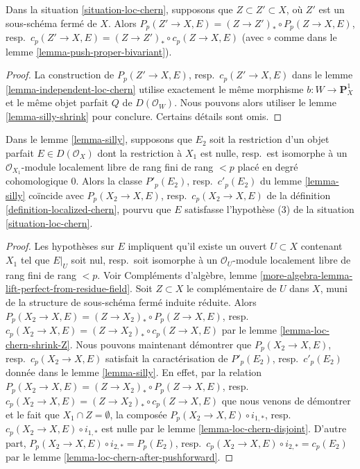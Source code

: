 \begin{lemma}
\label{lemma-loc-chern-shrink-Z}
Dans la situation \ref{situation-loc-chern},
supposons que $Z \subset Z' \subset X$, où $Z'$ est un sous-schéma fermé de $X$.
Alors
$P_p(Z' \to X, E) = (Z \to Z')_* \circ P_p(Z \to X, E)$,
resp.\ $c_p(Z' \to X, E) = (Z \to Z')_* \circ c_p(Z \to X, E)$
(avec $\circ$ comme dans le lemme \ref{lemma-push-proper-bivariant}).
\end{lemma}

\begin{proof}
La construction de $P_p(Z' \to X, E)$,
resp.\ $c_p(Z' \to X, E)$ dans le lemme \ref{lemma-independent-loc-chern}
utilise exactement le même morphisme
$b : W \to \mathbf{P}^1_X$ et le même objet parfait $Q$ de $D(\mathcal{O}_W)$.
Nous pouvons alors utiliser le lemme \ref{lemma-silly-shrink} pour conclure.
Certains détails sont omis.
\end{proof}

\begin{lemma}
\label{lemma-loc-chern-agree}
Dans le lemme \ref{lemma-silly}, supposons que $E_2$ soit la restriction d'un objet parfait
$E \in D(\mathcal{O}_X)$ dont la restriction à $X_1$ est nulle,
resp.\ est isomorphe à un $\mathcal{O}_{X_1}$-module localement libre de rang fini
de rang $< p$ placé en degré cohomologique $0$. Alors la classe
$P'_p(E_2)$, resp.\ $c'_p(E_2)$ du lemme \ref{lemma-silly} coïncide avec
$P_p(X_2 \to X, E)$, resp.\ $c_p(X_2 \to X, E)$ de la
définition \ref{definition-localized-chern}, pourvu que $E$ satisfasse
l'hypothèse (3) de la situation \ref{situation-loc-chern}.
\end{lemma}

\begin{proof}
Les hypothèses sur $E$ impliquent qu'il existe un ouvert $U \subset X$
contenant $X_1$ tel que $E|_U$ soit nul, resp.\ soit isomorphe à un
$\mathcal{O}_U$-module localement libre de rang fini de rang $< p$. Voir Compléments d'algèbre, lemme
\ref{more-algebra-lemma-lift-perfect-from-residue-field}.
Soit $Z \subset X$ le complémentaire de $U$ dans $X$, muni de
la structure de sous-schéma fermé induite réduite. Alors
$P_p(X_2 \to X, E) = (Z \to X_2)_* \circ P_p(Z \to X, E)$,
resp.\ $c_p(X_2 \to X, E) = (Z \to X_2)_* \circ c_p(Z \to X, E)$
par le lemme \ref{lemma-loc-chern-shrink-Z}.
Nous pouvons maintenant démontrer que $P_p(X_2 \to X, E)$, resp.\ $c_p(X_2 \to X, E)$
satisfait la caractérisation de $P'_p(E_2)$, resp.\ $c'_p(E_2)$
donnée dans le lemme \ref{lemma-silly}. En effet, par la relation
$P_p(X_2 \to X, E) = (Z \to X_2)_* \circ P_p(Z \to X, E)$,
resp.\ $c_p(X_2 \to X, E) = (Z \to X_2)_* \circ c_p(Z \to X, E)$
que nous venons de démontrer et le fait que $X_1 \cap Z = \emptyset$,
la composée $P_p(X_2 \to X, E) \circ i_{1, *}$,
resp.\ $c_p(X_2 \to X, E) \circ i_{1, *}$ est nulle
par le lemme \ref{lemma-loc-chern-disjoint}.
D'autre part,
$P_p(X_2 \to X, E) \circ i_{2, *} = P_p(E_2)$,
resp.\ $c_p(X_2 \to X, E) \circ i_{2, *} = c_p(E_2)$
par le lemme \ref{lemma-loc-chern-after-pushforward}.
\end{proof}





